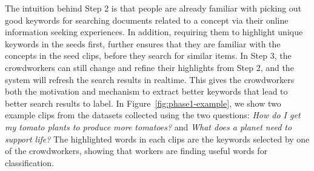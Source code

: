
The intuition behind Step 2 is that people are already familiar with picking out good 
keywords for searching documents related to a concept via their online information
seeking experiences. In addition, requiring them to highlight unique keywords in the seeds
first, further ensures that they are familiar with the concepts in the seed clips, before
they search for similar items. In Step 3, the crowdworkers can still change and refine their
highlights from Step 2, and the system will refresh the search results in realtime. This
gives the crowdworkers both the motivation and mechanism to extract better keywords that lead
to better search results to label.
In Figure~\ref{fig:phase1-example}, we show two example clips from the datasets
collected using the two questions: \emph{How do I get my tomato plants to produce
more tomatoes?} and \emph{What does a planet need to support life?}
The highlighted words in each clips are the keywords selected by
one of the crowdworkers, showing that workers are finding useful words for classification.


